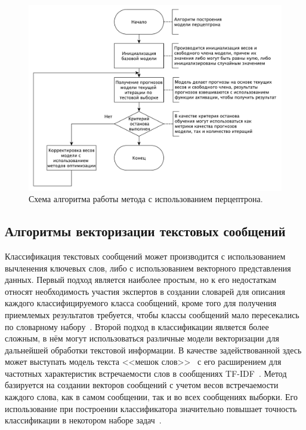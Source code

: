 \begin{figure}[H]
	\centering
	\includegraphics[width=\textwidth]{inc/schemePerceptrone.pdf}
	\caption{ Схема алгоритма работы метода с использованием перцептрона. }
	\label{img:schemePerceptrone}
\end{figure}

\subsection{Алгоритмы векторизации текстовых сообщений}

Классификация текстовых сообщений может производится с использованием вычленения ключевых слов, либо с использованием векторного представления данных.
Первый подход является наиболее простым, но к его недостаткам относят необходимость участия экспертов в создании словарей для описания каждого классифицируемого класса сообщений, кроме того для получения приемлемых результатов требуется, чтобы классы сообщений мало пересекались по словарному набору~\cite{vectorizations}.
Второй подход в классификации является более сложным, в нём могут использоваться различные модели векторизации для дальнейшей обработки текстовой информации.
В качестве задействованной здесь может выступать модель текста <<мешок слов>>~\cite{bagOfWords} с его расширением для частотных характеристик встречаемости слов в сообщениях TF-IDF~\cite{tfIdf}.
Метод базируется на создании векторов сообщений с учетом весов встречаемости каждого слова, как в самом сообщении, так и во всех сообщениях выборки.
Его использование при построении классификатора значительно повышает точность классификации в некотором наборе задач~\cite{vectorizations}.

